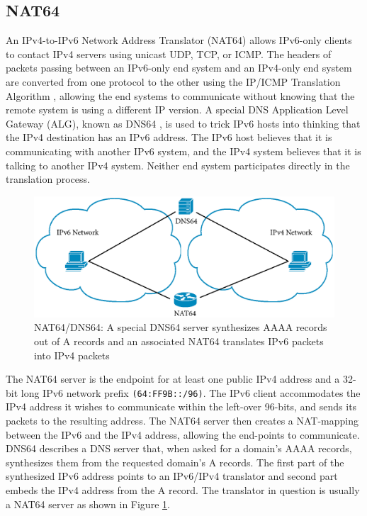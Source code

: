 \documentclass{llncs}
\begin{document}
\subsection{NAT64}
\label{sec:nat64}
An IPv4-to-IPv6 Network Address Translator (NAT64) \cite{NAT64} allows IPv6-only clients to contact IPv4 servers using unicast UDP, TCP, or ICMP. The headers of packets passing between an IPv6-only end system and an IPv4-only end system are converted from one protocol to the other using the IP/ICMP Translation Algorithm \cite{rfc6145}, allowing the end systems to communicate without knowing that the remote system is using a different IP version. A special DNS Application Level Gateway (ALG), known as DNS64 \cite{DNS64}, is used to trick IPv6 hosts into thinking that the IPv4 destination has an IPv6 address. The IPv6 host believes that it is communicating with another IPv6 system, and the IPv4 system believes that it is talking to another IPv4 system. Neither end system participates directly in the translation process. 

\begin{figure}[t]
  \centering
  \includegraphics*[width=0.85\linewidth]{nat64} 
  \caption{NAT64/DNS64: A special DNS64 server synthesizes AAAA     records out of A records and an associated NAT64 translates IPv6 packets into IPv4 packets}
  \label{fig:NAT64}
\end{figure}

The NAT64 server is the endpoint for at least one public IPv4 address and a 32-bit long IPv6 network prefix \texttt{(64:FF9B::/96)}. The IPv6 client accommodates the IPv4 address it wishes to communicate within the left-over 96-bits, and sends its packets to the resulting address. The NAT64 server then creates a NAT-mapping between the IPv6 and the IPv4 address, allowing the end-points to communicate. DNS64 describes a DNS server that, when asked for a domain's AAAA records, synthesizes them from the requested domain's A records. The first part of the synthesized IPv6 address points to an IPv6/IPv4 translator and second part embeds the IPv4 address from the A record. The translator in question is usually a NAT64 server as shown in Figure \ref{fig:NAT64}.
\end{document}

